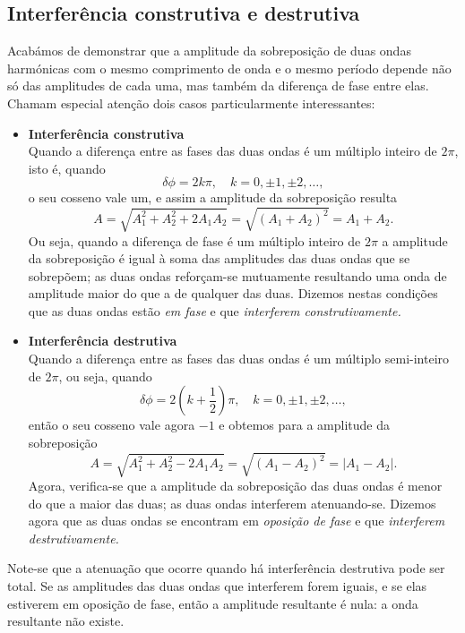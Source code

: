 \subsection{Interferência construtiva e destrutiva}
\label{sec:condint}
Acabámos de demonstrar que a amplitude da sobreposição de duas ondas harmónicas
com o mesmo comprimento de onda e o mesmo período depende não só das amplitudes
de cada uma, mas também da diferença de fase entre elas. Chamam especial atenção
dois casos particularmente interessantes:
\begin{itemize}
\item \textbf{Interferência construtiva}\\
Quando a diferença entre as fases das duas ondas é um múltiplo inteiro de $2\pi$,
isto é, quando
\begin{equation*}
\delta\phi = 2k\pi,\quad k=0,\pm1,\pm2,\ldots,
\end{equation*}
o seu cosseno vale um, e assim a amplitude da sobreposição resulta
\begin{equation*}
A=\sqrt{A_1^2 + A_2^2+2A_1A_2}=\sqrt{(A_1+A_2)^2}=A_1+A_2.
\end{equation*}
Ou seja, quando a diferença de fase é um múltiplo inteiro de $2\pi$ a amplitude
da sobre\-posição é igual à soma das amplitudes das duas ondas que se sobrepõem;
as duas ondas reforçam-se mutuamente resultando uma onda de amplitude maior do
que a de qualquer das duas. Dizemos nestas condições que as duas ondas estão
\emph{em fase} e que \emph{interferem construtivamente.}
\item \textbf{Interferência destrutiva}\\
Quando a diferença entre as fases das duas ondas é um múltiplo semi-inteiro de
$2\pi$, ou seja, quando
\begin{equation*}
\delta\phi = 2\left(k+\frac{1}{2}\right)\pi,\quad k=0,\pm1,\pm2,\ldots,
\end{equation*}
então o seu cosseno vale agora $-1$ e obtemos para a amplitude da sobreposição
\begin{equation*}
A=\sqrt{A_1^2 + A_2^2 - 2A_1A_2} = \sqrt{(A_1-A_2)^2}=\left|A_1-A_2\right|.
\end{equation*}
Agora, verifica-se que a amplitude da sobreposição das duas ondas é menor do que
a maior das duas; as duas ondas interferem atenuando-se. Dizemos agora que as
duas ondas se encontram em \emph{oposição de fase} e que \emph{interferem
destrutivamente.}
\end{itemize}
Note-se que a atenuação que ocorre quando há interferência destrutiva pode ser
total. Se as amplitudes das duas ondas que interferem forem iguais, e se elas
estiverem em oposição de fase, então a amplitude resultante é nula: a onda
resultante não existe.

